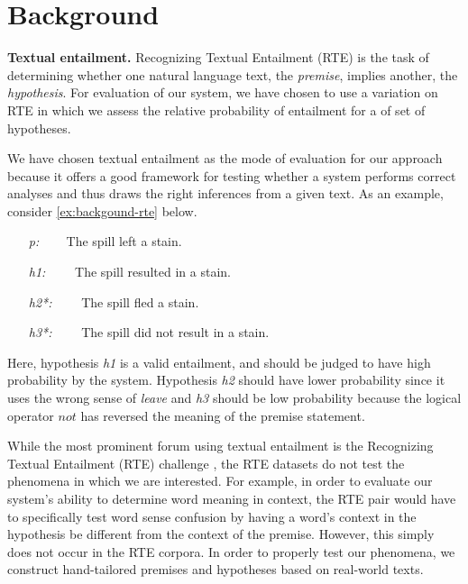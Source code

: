 \section{Background}

\textbf{Textual entailment.}
Recognizing Textual Entailment (RTE) is the task of determining whether one
natural language text, the {\it premise}, implies another, the {\it hypothesis}.
For evaluation of our system, we have chosen to use a variation on RTE in which
we assess the relative probability of entailment for a of set of hypotheses.

We have chosen textual entailment as the mode of evaluation
for our approach because it offers a good framework for testing whether a system
performs correct analyses and thus draws the right inferences from a given text.
As an example, consider \eqref{ex:backgound-rte} below.    
\begin{covex}\label{ex:backgound-rte}
\begin{itemize} \itemsep -3pt
  \item[{\it p:}]~~~    The spill left a stain.
  \item[{\it h1:}]~~~~The spill resulted in a stain.
  \item[{\it h2*:}]~~~~The spill fled a stain.
  \item[{\it h3*:}]~~~~The spill did not result in a stain.
\end{itemize}
\end{covex}
Here, hypothesis {\it h1} is a valid entailment, and should be judged to have
high probability by the system.  Hypothesis {\it h2} should have lower probability since
it uses the wrong sense of {\it leave} and {\it h3} should be low probability
because the logical operator $not$ has reversed the meaning of the premise
statement.

While the most prominent forum using textual entailment is the Recognizing
Textual Entailment (RTE) challenge \citep{dagan:rte2005}, the RTE datasets do
not test the phenomena in which we are interested. For example, in order to
evaluate our system's ability to determine word meaning in context, the RTE pair
would have to specifically test word sense confusion by having a word's context
in the hypothesis be different from the context of the premise.  However, this
simply does not occur in the RTE corpora.  In order to properly test our
phenomena, we construct hand-tailored premises and hypotheses based on
real-world texts.

